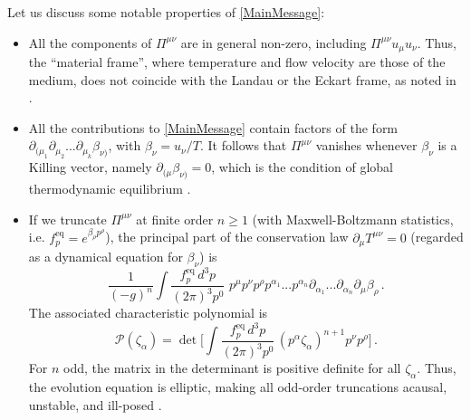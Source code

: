 \documentclass[a4paper, amsfonts, amssymb, amsmath, reprint, showkeys, twoside,notitlepage]{revtex4-2}
\newcommand{\Kn}{\text{Kn}}
\begin{document}
Let us discuss some notable properties of \eqref{MainMessage}:
\begin{itemize}
\item All the components of $\Pi^{\mu \nu}$ are in general non-zero, including $\Pi^{\mu \nu}u_\mu u_\nu$. Thus, the ``material frame'', where temperature and flow velocity are those of the medium, does not coincide with the Landau or the Eckart frame, as noted in \cite{Weinberg1971}.
\item All the contributions to \eqref{MainMessage} contain factors of the form $\partial_{(\mu_1} \partial_{\mu_2}...\partial_{\mu_k}\beta_{\nu)}$, with $\beta_\nu=u_\nu/T$. It follows that $\Pi^{\mu \nu}$ vanishes whenever $\beta_\nu$ is a Killing vector, namely $\partial_{(\mu}\beta_{\nu)}=0$, which is the condition of global thermodynamic equilibrium \cite{Israel_Stewart_1979,BecattiniBeta2016,GavassinoGibbs2021,GavassinoStabilityCarter2022}.
\item If we truncate $\Pi^{\mu \nu}$ at finite order $n\geq 1$ (with Maxwell-Boltzmann statistics, i.e. $f^{\text{eq}}_p{=}e^{\beta_\rho p^\rho}$), the principal part of the conservation law $\partial_\mu T^{\mu \nu}=0$ (regarded as a dynamical equation for $\beta_\nu$) is 
\begin{equation}
 \dfrac{1}{ (-g)^{n}}\int \! \dfrac{f^{\text{eq}}_p \, d^3p}{(2\pi)^3  p^0} \,  \, p^\mu p^\nu p^\rho  p^{\alpha_1}...p^{\alpha_n} \partial_{\alpha_1}...\partial_{\alpha_n} \partial_\mu\beta_{\rho} \, .
\end{equation}
The associated characteristic polynomial \cite{CourantHilbert2_book} is
\begin{equation}
   \mathcal{P}(\zeta_\alpha)= \det\bigg[ \int \! \dfrac{ f^{\text{eq}}_p \, d^3p}{(2\pi)^3  p^0} \,  (p^\alpha \zeta_\alpha)^{n+1} p^\nu p^\rho \bigg] \, .
\end{equation}
For $n$ odd, the matrix in the determinant is positive definite for all $\zeta_\alpha$. Thus, the evolution equation is elliptic, making all odd-order truncations acausal, unstable, and ill-posed \cite{Rauch_book,GavassinoCasmir2022,GavassinoSuperluminal2021}.
\end{itemize}
\end{document}
